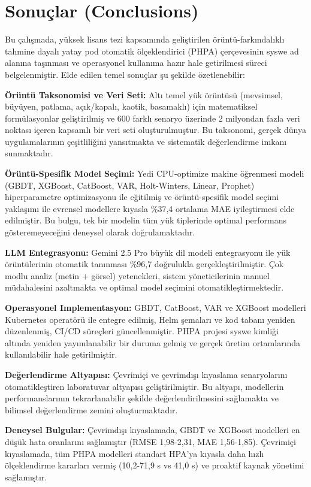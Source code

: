 
\section{Sonuçlar (Conclusions)}

Bu çalışmada, yüksek lisans tezi kapsamında geliştirilen örüntü-farkındalıklı tahmine dayalı yatay pod otomatik ölçeklendirici (PHPA) çerçevesinin syswe ad alanına taşınması ve operasyonel kullanıma hazır hale getirilmesi süreci belgelenmiştir. Elde edilen temel sonuçlar şu şekilde özetlenebilir:

\textbf{Örüntü Taksonomisi ve Veri Seti:} Altı temel yük örüntüsü (mevsimsel, büyüyen, patlama, açık/kapalı, kaotik, basamaklı) için matematiksel formülasyonlar geliştirilmiş ve 600 farklı senaryo üzerinde 2 milyondan fazla veri noktası içeren kapsamlı bir veri seti oluşturulmuştur. Bu taksonomi, gerçek dünya uygulamalarının çeşitliliğini yansıtmakta ve sistematik değerlendirme imkanı sunmaktadır.

\textbf{Örüntü-Spesifik Model Seçimi:} Yedi CPU-optimize makine öğrenmesi modeli (GBDT, XGBoost, CatBoost, VAR, Holt-Winters, Linear, Prophet) hiperparametre optimizasyonu ile eğitilmiş ve örüntü-spesifik model seçimi yaklaşımı ile evrensel modellere kıyasla \%37,4 ortalama MAE iyileştirmesi elde edilmiştir. Bu bulgu, tek bir modelin tüm yük tiplerinde optimal performans gösteremeyeceğini deneysel olarak doğrulamaktadır.

\textbf{LLM Entegrasyonu:} Gemini 2.5 Pro büyük dil modeli entegrasyonu ile yük örüntülerinin otomatik tanınması \%96,7 doğrulukla gerçekleştirilmiştir. Çok modlu analiz (metin + görsel) yetenekleri, sistem yöneticilerinin manuel müdahalesini azaltmakta ve optimal model seçimini otomatikleştirmektedir.

\textbf{Operasyonel Implementasyon:} GBDT, CatBoost, VAR ve XGBoost modelleri Kubernetes operatörü ile entegre edilmiş, Helm şemaları ve kod tabanı yeniden düzenlenmiş, CI/CD süreçleri güncellenmiştir. PHPA projesi syswe kimliği altında yeniden yayımlanabilir bir duruma gelmiş ve gerçek üretim ortamlarında kullanılabilir hale getirilmiştir.

\textbf{Değerlendirme Altyapısı:} Çevrimiçi ve çevrimdışı kıyaslama senaryolarını otomatikleştiren laboratuvar altyapısı geliştirilmiştir. Bu altyapı, modellerin performanslarının tekrarlanabilir şekilde değerlendirilmesini sağlamakta ve bilimsel değerlendirme zemini oluşturmaktadır.

\textbf{Deneysel Bulgular:} Çevrimdışı kıyaslamada, GBDT ve XGBoost modelleri en düşük hata oranlarını sağlamıştır (RMSE 1,98-2,31, MAE 1,56-1,85). Çevrimiçi kıyaslamada, tüm PHPA modelleri standart HPA'ya kıyasla daha hızlı ölçeklendirme kararları vermiş (10,2-71,9 s vs 41,0 s) ve proaktif kaynak yönetimi sağlamıştır.

